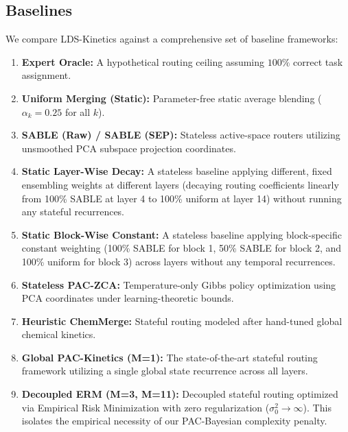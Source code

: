\subsection{Baselines}
We compare LDS-Kinetics against a comprehensive set of baseline frameworks:
\begin{enumerate}
    \item \textbf{Expert Oracle:} A hypothetical routing ceiling assuming $100\%$ correct task assignment.
    \item \textbf{Uniform Merging (Static):} Parameter-free static average blending ($\alpha_k = 0.25$ for all $k$).
    \item \textbf{SABLE (Raw) / SABLE (SEP):} Stateless active-space routers utilizing unsmoothed PCA subspace projection coordinates.
    \item \textbf{Static Layer-Wise Decay:} A stateless baseline applying different, fixed ensembling weights at different layers (decaying routing coefficients linearly from 100\% SABLE at layer 4 to 100\% uniform at layer 14) without running any stateful recurrences.
    \item \textbf{Static Block-Wise Constant:} A stateless baseline applying block-specific constant weighting (100\% SABLE for block 1, 50\% SABLE for block 2, and 100\% uniform for block 3) across layers without any temporal recurrences.
    \item \textbf{Stateless PAC-ZCA:} Temperature-only Gibbs policy optimization using PCA coordinates under learning-theoretic bounds.
    \item \textbf{Heuristic ChemMerge:} Stateful routing modeled after hand-tuned global chemical kinetics.
    \item \textbf{Global PAC-Kinetics (M=1):} The state-of-the-art stateful routing framework utilizing a single global state recurrence across all layers.
    \item \textbf{Decoupled ERM (M=3, M=11):} Decoupled stateful routing optimized via Empirical Risk Minimization with zero regularization ($\sigma_0^2 \to \infty$). This isolates the empirical necessity of our PAC-Bayesian complexity penalty.
\end{enumerate}

